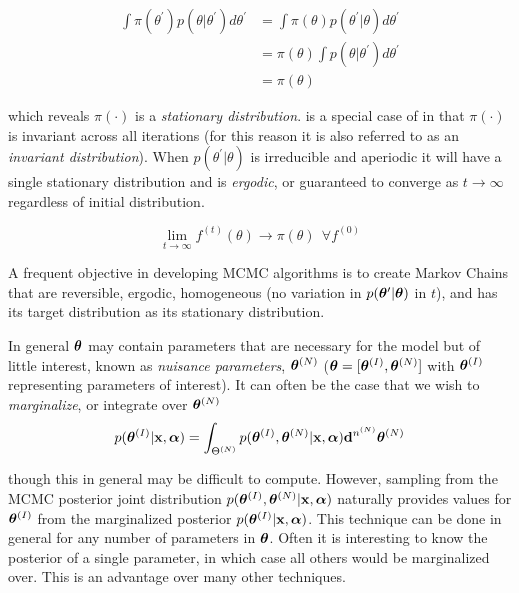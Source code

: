 \begin{equation}
\begin{aligned}
\int \pi (\theta^{\prime}) p(\theta|\theta^{\prime}) d\theta^{\prime} &=
\int \pi (\theta) p(\theta^{\prime}|\theta) d\theta^{\prime} \\
&= \pi (\theta) \int p(\theta|\theta^{\prime}) d\theta^{\prime} \\
&= \pi (\theta)
\end{aligned}
\label{eq:er_nr_calibrations_parameter_determ_mcmc_stationary}
\end{equation}

\noindent which reveals $\pi (\cdot)$ is a
\textit{stationary distribution}.   is a special case of
 in that $\pi( \cdot )$ is invariant across all iterations (for this reason
it is also referred to as an \textit{invariant distribution}).  When $p(\theta^{\prime}|\theta)$ is irreducible and
aperiodic it will have a single stationary distribution and is \textit{ergodic}, or guaranteed to converge as
$t \rightarrow \infty$ regardless of initial distribution.

\begin{equation}
\lim_{t \rightarrow \infty} f^{(t)}(\theta) \rightarrow \pi (\theta)\ \ \forall f^{(0)}
\end{equation}

A frequent objective in developing MCMC algorithms is to create Markov Chains that are reversible, ergodic, homogeneous
(no variation in $p(\boldsymbol{\theta}^{\prime}|\boldsymbol{\theta})$ in $t$), and has its target distribution as its stationary distribution.

In general $\boldsymbol{\theta}$ may contain parameters that are necessary for the model but of little interest,
known as \textit{nuisance parameters}, $\boldsymbol{\theta}^{(N)}$ ($\boldsymbol{\theta} = [\boldsymbol{\theta}^{(I)}, \boldsymbol{\theta}^{(N)}]$ with
$\boldsymbol{\theta}^{(I)}$ representing parameters of interest).  It can often be the case that we wish to \textit{marginalize}, or integrate
over $\boldsymbol{\theta}^{(N)}$
\begin{equation}
p(\boldsymbol{\theta}^{(I)}|\mathbf{x}, \boldsymbol{\alpha}) = \int_{\Theta^{(N)}}
p(\boldsymbol{\theta}^{(I)}, \boldsymbol{\theta}^{(N)}|\mathbf{x}, \boldsymbol{\alpha}) \mathbf{d}^{n^{(N)}}\boldsymbol{\theta}^{(N)}
\end{equation}

\noindent though this in general may be difficult to compute.  However, sampling from the MCMC posterior joint distribution
$p(\boldsymbol{\theta}^{(I)}, \boldsymbol{\theta}^{(N)}|\mathbf{x}, \boldsymbol{\alpha})$ naturally provides values for $\boldsymbol{\theta}^{(I)}$ from the
marginalized posterior $p(\boldsymbol{\theta}^{(I)}|\mathbf{x}, \boldsymbol{\alpha})$.  This technique can be done in general for any number of
parameters in $\boldsymbol{\theta}$.  Often it is interesting to know the posterior of a single parameter, in which case all others would
be marginalized over.  This is an advantage over many other techniques.

